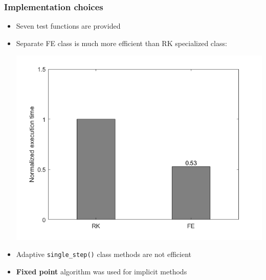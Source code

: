 \documentclass{beamer}
\begin{document}
\begin{frame} %
	\frametitle{Implementation choices}
	\begin{itemize}
		\item Seven test functions are provided
		\item Separate FE class is much more efficient than RK specialized class:
		\begin{center}
			\includegraphics[scale=0.3]{etc/FE_vs_RK.jpeg}
		\end{center}	
		\item Adaptive \texttt{single\_step()} class methods are not efficient
				\item \textbf{Fixed point} algorithm was used for implicit methods
	\end{itemize}
\end{frame}
\end{document}
